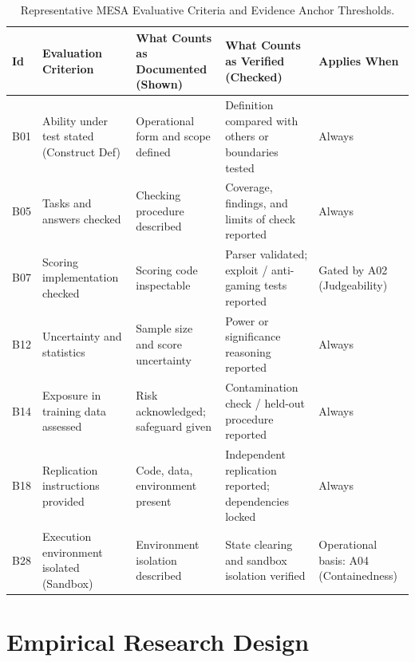 \documentclass[runningheads]{llncs}
\begin{document}
\begin{table}[t]
\caption{Representative MESA Evaluative Criteria and Evidence Anchor Thresholds.}
\label{tab:rubric_summary}
\centering
\scriptsize
\setlength{\tabcolsep}{3pt}
\begin{tabularx}{\textwidth}{@{}l>{\raggedright\arraybackslash}p{2.6cm}>{\raggedright\arraybackslash}X>{\raggedright\arraybackslash}X>{\raggedright\arraybackslash}p{2.2cm}@{}}
\toprule
\textbf{Id} & \textbf{Evaluation Criterion} & \textbf{What Counts as Documented (Shown)} & \textbf{What Counts as Verified (Checked)} & \textbf{Applies When} \\
\midrule
B01 & Ability under test stated (Construct Def) & Operational form and scope defined & Definition compared with others or boundaries tested & Always \\
B05 & Tasks and answers checked & Checking procedure described & Coverage, findings, and limits of check reported & Always \\
B07 & Scoring implementation checked & Scoring code inspectable & Parser validated; exploit / anti-gaming tests reported & Gated by A02 (Judgeability) \\
B12 & Uncertainty and statistics & Sample size and score uncertainty & Power or significance reasoning reported & Always \\
B14 & Exposure in training data assessed & Risk acknowledged; safeguard given & Contamination check / held-out procedure reported & Always \\
B18 & Replication instructions provided & Code, data, environment present & Independent replication reported; dependencies locked & Always \\
B28 & Execution environment isolated (Sandbox) & Environment isolation described & State clearing and sandbox isolation verified & Operational basis: A04 (Containedness) \\
\bottomrule
\end{tabularx}
\end{table}

\section{Empirical Research Design}
\label{sec:research_design}
\end{document}
